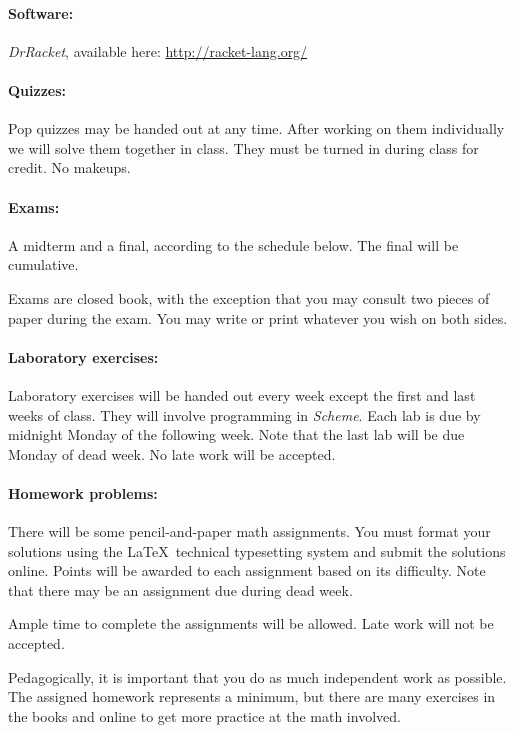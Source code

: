 \documentclass{article}
\begin{document}
\paragraph{Software:} {\em DrRacket}, available here: 
\url{http://racket-lang.org/}

\paragraph{Quizzes:}  
Pop quizzes may be handed out at any time.  After working
on them individually we will solve them together in class.
They must be turned in during class for credit.  No makeups.

\paragraph{Exams:} A midterm and a final, according to the schedule below.
The final will be cumulative.

Exams are closed book, with the exception that you may
consult two pieces of paper during the exam.  You may write or print
whatever you wish on both sides.

\paragraph{Laboratory exercises:}
Laboratory exercises will be handed out every week except
the first and last weeks of class.  They will involve
programming in {\em Scheme}.
Each lab is due by midnight Monday of the following week.
Note that the last lab will be due Monday of dead week.
No late work will be accepted.

\paragraph{Homework problems:}
There will be some pencil-and-paper math assignments.  You must format
your solutions using the \LaTeX\ technical typesetting system and
submit the solutions online. Points will be awarded to each assignment
based on its difficulty.  Note that there may be an assignment due
during dead week.

Ample time to complete the assignments will be allowed.
Late work will not be accepted.  

Pedagogically, it is important that you do as much independent work as
possible.  The assigned homework represents a minimum, but there are
many exercises in the books and online to get more practice at the
math involved.
\end{document}
